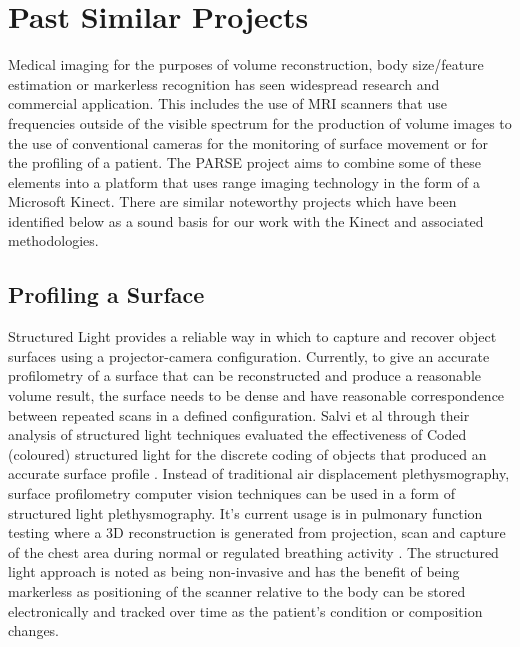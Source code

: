 \section{Past Similar Projects}

Medical imaging for the purposes of volume reconstruction, body size/feature estimation or markerless recognition has seen widespread research and commercial application. This includes the use of MRI scanners that use frequencies outside of the visible spectrum for the production of volume images to the use of conventional cameras for the monitoring of surface movement or for the profiling of a patient. The PARSE project aims to combine some of these elements into a platform that uses range imaging technology in the form of a Microsoft Kinect. There are similar noteworthy projects which have been identified below as a sound basis for our work with the Kinect and associated methodologies. \\

\subsection{Profiling a Surface}

Structured Light provides a reliable way in which to capture and recover object surfaces using a projector-camera configuration. Currently, to give an accurate profilometry of a surface that can be reconstructed and produce a reasonable volume result, the surface needs to be dense and have reasonable correspondence between repeated scans in a defined configuration. Salvi et al through their analysis of structured light techniques evaluated the effectiveness of Coded (coloured) structured light for the discrete coding of objects that produced an accurate surface profile \cite{Salvi2010}. Instead of traditional air displacement plethysmography, surface profilometry computer vision techniques can be used in a form of structured light plethysmography. It's current usage is in pulmonary function testing where a 3D reconstruction is generated from projection, scan and capture of the chest area during normal or regulated breathing activity \cite{DeBoer2010}. The structured light approach is noted as being non-invasive and has the benefit of being markerless as positioning of the scanner relative to the body can be stored electronically and tracked over time as the patient's condition or composition changes. \\


